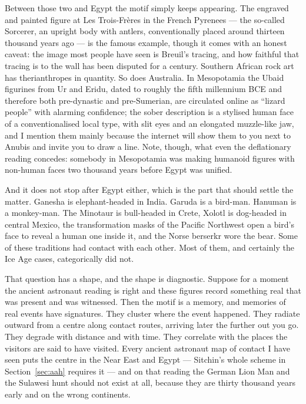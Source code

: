 Between those two and Egypt the motif simply keeps appearing. The engraved and painted figure at
Les Trois-Fr\`eres in the French Pyrenees --- the so-called Sorcerer, an upright body with antlers,
conventionally placed around thirteen thousand years ago --- is the famous example, though it comes
with an honest caveat: the image most people have seen is Breuil's tracing, and how faithful that
tracing is to the wall has been disputed for a century. Southern African rock art has
therianthropes in quantity. So does Australia. In Mesopotamia the Ubaid figurines from Ur and
Eridu, dated to roughly the fifth millennium BCE and therefore both pre-dynastic and pre-Sumerian,
are circulated online as ``lizard people'' with alarming confidence; the sober description is a
stylised human face of a conventionalised local type, with slit eyes and an elongated muzzle-like
jaw, and I mention them mainly because the internet will show them to you next to Anubis and invite
you to draw a line. Note, though, what even the deflationary reading concedes: somebody in
Mesopotamia was making humanoid figures with non-human faces two thousand years before Egypt was
unified.

And it does not stop after Egypt either, which is the part that should settle the matter. Ganesha
is elephant-headed in India. Garuda is a bird-man. Hanuman is a monkey-man. The Minotaur is
bull-headed in Crete, Xolotl is dog-headed in central Mexico, the transformation masks of the
Pacific Northwest open a bird's face to reveal a human one inside it, and the Norse berserkr
wore the bear. Some of these traditions had contact with each other. Most of them, and certainly
the Ice Age cases, categorically did not.


That question has a shape, and the shape is diagnostic. Suppose for a moment the ancient astronaut
reading is right and these figures record something real that was present and was witnessed. Then
the motif is a memory, and memories of real events have signatures. They cluster where the event
happened. They radiate outward from a centre along contact routes, arriving later the further out
you go. They degrade with distance and with time. They correlate with the places the visitors are
said to have visited. Every ancient astronaut map of contact I have seen puts the centre in the
Near East and Egypt --- Sitchin's whole scheme in Section~\ref{sec:aah} requires it --- and on that
reading the German Lion Man and the Sulawesi hunt should not exist at all, because they are
thirty thousand years early and on the wrong continents.

